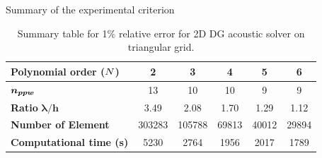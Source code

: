 
\begin{frame}{Summary of the experimental criterion}
  \small
      \hspace{-1cm}
  \begin{table}[!htbp]
    \begin{tabular}{|l|c|c|c|c|c|}
    \hline
        \textbf{Polynomial order (${N}$)} & 2 & 3 & 4 & 5 & 6 \\ \hline
        $\boldsymbol{n_{ppw}}$  & 13 & 10 & 10 & 9 & 9 \\ \hline
        \textbf{Ratio} $\boldsymbol{\lambda/h}$ & 3.49 & 2.08 & 1.70 & 1.29 & 1.12 \\ \hline
        \textbf{Number of Element} & 303283 & 105788 & 69813 & 40012 & 29894 \\ \hline
        \textbf{Computational time (s)} & 5230 & 2764 & 1956 & 2017  & 1789\\ \hline
    \end{tabular}
    \caption{Summary table for 1$\%$ relative error for 2D DG acoustic solver on triangular grid.}
    \label{recap_ppw}
  \end{table}
\end{frame}








